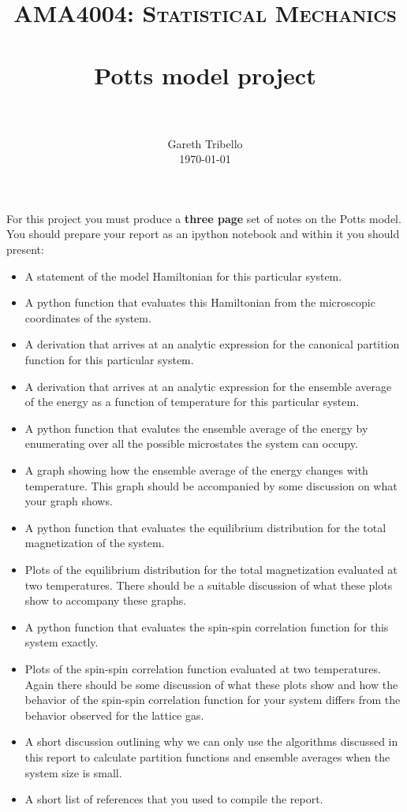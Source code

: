 \documentclass[paper=a4, fontsize=11pt]{scrartcl}
\title{\usefont{OT1}{bch}{b}{n} \normalfont \normalsize \textsc{AMA4004:
Statistical Mechanics} \\ [25pt] \horrule{0.5pt} \\[0.4cm] 
\huge Potts model project \\
\horrule{2pt} \\[0.25cm]
}
\author{ \normalfont
\normalsize
        Gareth Tribello \\[-3pt] \normalsize
        \today
}
\date{}
\numberwithin{equation}{section}
\numberwithin{figure}{section}
\numberwithin{table}{section}
\begin{document}
\maketitle

For this project you must produce a {\bfseries three page} set of notes on the Potts model.  You should prepare your report as an ipython notebook and within 
it you should present:

\begin{itemize}
 \item A statement of the model Hamiltonian for this particular system.
 \item A python function that evaluates this Hamiltonian from the microscopic coordinates of the system. 
 \item A derivation that arrives at an analytic expression for the canonical partition function for this particular system.
 \item A derivation that arrives at an analytic expression for the ensemble average of the energy as a function of temperature for this particular system.
 \item A python function that evalutes the ensemble average of the energy by enumerating over all the possible microstates the system can occupy.  
 \item A graph showing how the ensemble average of the energy changes with temperature.  This graph should be accompanied by some discussion on what your graph shows.
 \item A python function that evaluates the equilibrium distribution for the total magnetization of the system.
 \item Plots of the equilibrium distribution for the total magnetization evaluated at two temperatures.  There should be a suitable discussion of what these plots show to accompany these graphs.
 \item A python function that evaluates the spin-spin correlation function for this system exactly.
 \item Plots of the spin-spin correlation function evaluated at two temperatures.  Again there should be some discussion of what these plots show and how the behavior of the spin-spin correlation function for your system differs from the behavior observed for the lattice gas.
 \item A short discussion outlining why we can only use the algorithms discussed in this report to calculate partition functions and ensemble averages when the system size is small.
 \item A short list of references that you used to compile the report.
\end{itemize}
\end{document}
